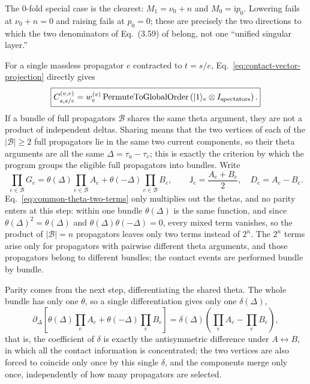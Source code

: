 \documentclass[11pt,a4paper]{article}
\newcommand{\ii}{\mathrm i}
\begin{document}
The $0$-fold special case is the clearest: $M_1=\nu_0+n$ and $M_0=\ii p_0$. Lowering fails at $\nu_0+n=0$ and raising fails at $p_0=0$; these are precisely the two directions to which the two denominators of Eq.~(3.59) of \cite{Chen:2023eic} belong, not one ``unified singular layer.''

For a single massless propagator $e$ contracted to $t=s/e$, Eq.~\eqref{eq:contact-vector-projection} directly gives
\begin{equation}
 \boxed{
 C_{s,s/e}^{(v,e)}
 =w_e^{(v)}
 \operatorname{PermuteToGlobalOrder}
 \left(|1\rangle_e\otimes I_{\rm spectators}\right).
 }
 \label{eq:contact-injection}
\end{equation}
If a bundle of full propagators $\mathcal B$ shares the same theta argument, they are not a product of independent deltas. Sharing means that the two vertices of each of the $|\mathcal B|\geq2$ full propagators lie in the same two current components, so their theta arguments are all the same $\Delta=\tau_u-\tau_v$; this is exactly the criterion by which the program groups the eligible full propagators into bundles. Write
\begin{equation}
 \prod_{e\in\mathcal B}G_e
 =\theta(\Delta)\prod_{e\in\mathcal B}A_e
 +\theta(-\Delta)\prod_{e\in\mathcal B}B_e,
 \qquad
 \mathsf J_e=\frac{A_e+B_e}{2},\quad D_e=A_e-B_e.
 \label{eq:common-theta-two-terms}
\end{equation}
Eq.~\eqref{eq:common-theta-two-terms} only multiplies out the thetas, and no parity enters at this step: within one bundle $\theta(\Delta)$ is the same function, and since $\theta(\Delta)^2=\theta(\Delta)$ and $\theta(\Delta)\theta(-\Delta)=0$, every mixed term vanishes, so the product of $|\mathcal B|=n$ propagators leaves only two terms instead of $2^n$. The $2^n$ terms arise only for propagators with pairwise different theta arguments, and those propagators belong to different bundles; the contact events are performed bundle by bundle.

Parity comes from the next step, differentiating the shared theta. The whole bundle has only one $\theta$, so a single differentiation gives only one $\delta(\Delta)$,
\begin{equation}
 \partial_\Delta\!\left[\theta(\Delta)\prod_eA_e
 +\theta(-\Delta)\prod_eB_e\right]
 =\delta(\Delta)\left(\prod_eA_e-\prod_eB_e\right),
 \label{eq:common-theta-delta}
\end{equation}
that is, the coefficient of $\delta$ is exactly the antisymmetric difference under $A\leftrightarrow B$, in which all the contact information is concentrated; the two vertices are also forced to coincide only once by this single $\delta$, and the components merge only once, independently of how many propagators are selected.
\end{document}
